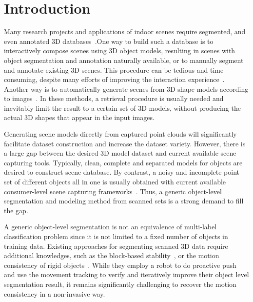 \section{Introduction}
\label{sec:intro}
Many research projects and applications of indoor scenes require segmented, and even annotated 3D databases~\cite{SearchClassify,SceneFromExample,Fisher:2012:ESO:2366145.2366154,Chen:2014:ASM:2661229.2661239,Fisher:ActivityCentricSceneSynthesis}.One way to build such a database is to interactively compose scenes using 3D object models, resulting in scenes with object segmentation and annotation naturally available, or to manually segment and annotate existing 3D scenes. This procedure can be tedious and time-consuming, despite many efforts of improving the interaction experience~\cite{Merrell:2011:IFL:2010324.1964982, Xu:2013:SSC:2461912.2461968}. Another way is to automatically generate scenes from 3D shape models according to images~\cite{Liu2015Model,Chen:2014:ASM:2661229.2661239}. In these methods, a retrieval procedure is usually needed and inevitably limit the result to a certain set of 3D models, without producing the actual 3D shapes that appear in the input images.

Generating scene models directly from captured point clouds will significantly facilitate dataset construction and increase the dataset variety. However, there is a large gap between the desired 3D model dataset and current available scene capturing tools. Typically, clean, complete and separated models for objects are desired to construct scene database. By contrast, a noisy and incomplete point set of different objects all in one is usually obtained with current available consumer-level scene capturing frameworks~\cite{KinectFusion, dai2016bundlefusion}. Thus, a generic object-level segmentation and modeling method from scanned sets is a strong demand to fill the gap.

A generic object-level segmentation is not an equivalence of multi-label classification problem since it is not limited to a fixed number of objects in training data. Existing approaches for segmenting scanned 3D data require additional knowledges, such as the block-based stability~\cite{3DReasoningfromBlockstoStability}, or the motion consistency of rigid objects~\cite{Xu:2015:ACS:2816795.2818075}. While they employ a robot to do proactive push and use the movement tracking to verify and iteratively improve their object level segmentation result, it remains significantly challenging to recover the motion consistency in a non-invasive way. 

